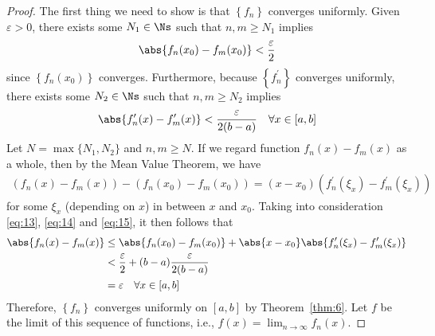 \documentclass[thmcnt=section, 12pt]{elegantbook}
\begin{document}
\begin{proof}
    The first thing we need to show is that $\left\{f_n\right\}$ converges uniformly. Given $\varepsilon > 0$, there exists some $N_1 \in \Ns$ such that $n, m \geq N_1$ implies
    \begin{align}
        \abs{f_n(x_0) - f_m(x_0)} < \frac{\varepsilon}{2}
        \label{eq:13}
    \end{align}
    since $\left\{f_n(x_0)\right\}$ converges. Furthermore, because $\left\{f_n^\prime\right\}$ converges uniformly, there exists some $N_2 \in \Ns$ such that $n, m \geq N_2$ implies
    \begin{align}
        \abs{f_n^\prime(x) - f_m^\prime(x)}
        < \frac{\varepsilon}{2(b-a)}
        \quad \forall x \in [a, b]
        \label{eq:14}
    \end{align}
    Let $N = \max\{N_1, N_2\}$ and $n, m \geq N$. If we regard function $f_n(x) - f_m(x)$ as a whole, then by the Mean Value Theorem, we have 
    \begin{align}
        \left(f_n(x) - f_m(x)\right)
        - \left(f_n(x_0) - f_m(x_0)\right)
        = (x - x_0) \left(f_n^\prime(\xi_x) - f_m^\prime(\xi_x)\right)
        \label{eq:15}
    \end{align}
    for some $\xi_x$ (depending on $x$) in between $x$ and $x_0$. Taking into consideration \eqref{eq:13}, \eqref{eq:14} and \eqref{eq:15}, it then follows that 
    \begin{align*}
        \abs{f_n(x) - f_m(x)}
        &\leq \abs{f_n(x_0) - f_m(x_0)}
        + \abs{x-x_0} \abs{f_n^\prime(\xi_x) - f_m^\prime(\xi_x)} \\ 
        &< \frac{\varepsilon}{2} 
        + (b-a) \frac{\varepsilon}{2(b-a)} \\ 
        &= \varepsilon \quad \forall x \in [a, b]
    \end{align*}
    Therefore, $\left\{f_n\right\}$ converges uniformly on $[a, b]$ by Theorem~\ref{thm:6}. Let $f$ be the limit of this sequence of functions, i.e., $f(x) = \lim_{n \to \infty} f_n(x)$.


\end{proof}
\end{document}
